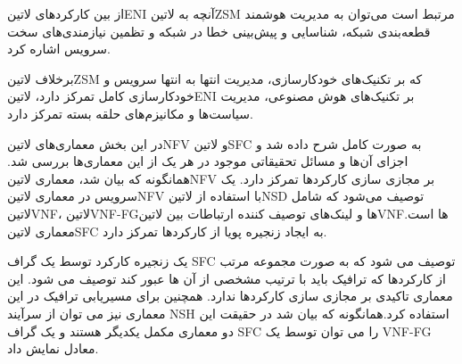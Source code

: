 
از بین کارکردهای ‌لاتین{ENI} آنچه به ‌لاتین{ZSM} مرتبط است
می‌توان به مدیریت هوشمند قطعه‌بندی شبکه، شناسایی و پیش‌بینی خطا در شبکه
و تظمین نیازمندی‌های سخت سرویس اشاره کرد.

برخلاف ‌لاتین{ZSM} که بر تکنیک‌های خودکارسازی، مدیریت انتها به انتها سرویس و
خودکارسازی کامل تمرکز دارد، ‌لاتین{ENI} بر تکنیک‌های هوش مصنوعی، مدیریت سیاست‌‌ها
و مکانیزم‌های حلقه بسته تمرکز دارد.


در این بخش معماری‌های ‌لاتین{NFV} و ‌لاتین{SFC} به صورت کامل شرح داده شد و اجزای آن‌ها و مسائل تحقیقاتی موجود در هر یک از این معماری‌ها بررسی شد.
همانگونه که بیان شد، معماری ‌لاتین{NFV} بر مجازی سازی کارکردها تمرکز دارد. یک سرویس در معماری ‌لاتین{NFV} با استفاده از ‌لاتین{NSD} توصیف می‌شود که شامل ‌لاتین{VNF}، ‌لاتین{VNF-FG}ها و لینک‌های توصیف کننده
ارتباطات بین ‌لاتین{VNF}ها است. معماری ‌لاتین{SFC} به ایجاد زنجیره پویا از کارکردها تمرکز دارد.

یک زنجیره کارکرد توسط یک گراف SFC توصیف می شود که به صورت مجموعه مرتب از کارکردها که ترافیک باید با ترتیب مشخصی از آن ها عبور کند توصیف می شود. این معماری تاکیدی بر مجازی سازی کارکردها ندارد. همچنین برای مسیریابی ترافیک در این معماری نیز می توان از سرآیند NSH استفاده کرد.همانگونه که بیان شد در حقیقت این دو معماری مکمل یکدیگر هستند و یک گراف SFC را می توان توسط یک VNF-FG معادل نمایش داد.
